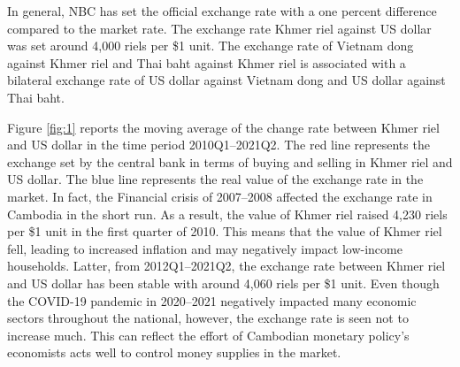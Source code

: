 \documentclass[11pt,letterpaper]{article}
\begin{document}
In general, NBC has set the official exchange rate with a one percent difference compared to the market rate. The exchange rate Khmer riel against US dollar was set around 4,000 riels per \$1 unit. The exchange rate of Vietnam dong against Khmer riel and Thai baht against Khmer riel is associated with a bilateral exchange rate of US dollar against Vietnam dong and US dollar against Thai baht. 


Figure \ref{fig:1} reports the moving average of the change rate between Khmer riel and US dollar in the time period 2010Q1--2021Q2. The red line represents the exchange set by the central bank in terms of buying and selling in Khmer riel and US dollar. The blue line represents the real value of the exchange rate in the market. In fact, the Financial crisis of 2007--2008 affected the exchange rate in Cambodia in the short run. As a result, the value of Khmer riel raised 4,230 riels per \$1 unit in the first quarter of 2010. This means that the value of Khmer riel fell, leading to increased inflation and may negatively impact low-income households. Latter, from 2012Q1--2021Q2, the exchange rate between Khmer riel and US dollar has been stable with around 4,060 riels per \$1 unit. Even though the COVID-19 pandemic in 2020--2021 negatively impacted many economic sectors throughout the national, however, the exchange rate is seen not to increase much. This can reflect the effort of Cambodian monetary policy's economists acts well to control money supplies in the market. 
\end{document}
